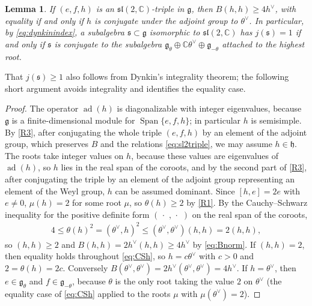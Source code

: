 \documentclass [leqno, 10pt]{amsart}
\newtheorem{lemma}[theorem]{Lemma}%
\theoremstyle{definition}
\numberwithin{equation}{section}
\newcommand{\h}{\mathfrak{h}}
\newcommand{\dum}{\,\cdot\,\,}
\newcommand{\spn}{\operatorname{Span}}
\newcommand{\sll}{\mathfrak{sl}}
\newcommand{\g}{\mathfrak{g}}
\newcommand{\ad}{\operatorname{ad}}
\newcommand{\com}{\mathbb C}
\newcommand{\hv}{h^\vee}
\newcommand{\subs}{\mathfrak{s}}
\begin{document}
\begin{lemma}\label{lem:Bh}
If $(e,f,h)$ is an $\sll(2,\com)$-triple in $\g$, then $B(h,h)\ge4\hv$, with equality if and only if $h$ is conjugate under the adjoint group to $\theta^\vee$. In particular, by \eqref{eq:dynkinindex}, a subalgebra $\subs \subset \g$ isomorphic to $\sll(2, \com)$ has $j(\subs) = 1$ if and only if $\subs$ is conjugate to the subalgebra $\g_{\theta} \oplus \com\theta^{\vee} \oplus \g_{-\theta}$ attached to the highest root.
\end{lemma}
That $j(\subs) \geq 1$ also follows from Dynkin's integrality theorem; the following short argument avoids integrality and identifies the equality case.
\begin{proof}
The operator $\ad(h)$ is diagonalizable with integer eigenvalues, because $\g$ is a finite-dimensional module for $\spn\{e, f, h\}$; in particular $h$ is semisimple. By \ref{R3}, after conjugating the whole triple $(e, f, h)$ by an element of the adjoint group, which preserves $B$ and the relations \eqref{eq:sl2triple}, we may assume $h \in \h$. The roots take integer values on $h$, because these values are eigenvalues of $\ad(h)$, so $h$ lies in the real span of the coroots, and by the second part of \ref{R3}, after conjugating the triple by an element of the adjoint group representing an element of the Weyl group, $h$ can be assumed dominant. Since $[h,e]=2e$ with $e\ne0$, $\mu(h)=2$ for some root $\mu$, so $\theta(h)\ge2$ by \ref{R1}. By the Cauchy--Schwarz inequality for the positive definite form $(\dum, \dum)$ on the real span of the coroots,
\begin{align}\label{eq:CSh}
4 \leq \theta(h)^2=(\theta^\vee,h)^2\le(\theta^{\vee},\theta^{\vee})(h,h)=2(h,h),
\end{align}
so $(h,h)\ge2$ and $B(h,h)=2\hv(h,h)\ge4\hv$ by \eqref{eq:Bnorm}. If $(h, h) = 2$, then equality holds throughout \eqref{eq:CSh}, so $h = c\theta^{\vee}$ with $c > 0$ and $2 = \theta(h) = 2c$. Conversely $B(\theta^\vee,\theta^\vee)=2\hv(\theta^{\vee},\theta^{\vee}) = 4\hv$. If $h = \theta^{\vee}$, then $e \in \g_{\theta}$ and $f \in \g_{-\theta}$, because $\theta$ is the only root taking the value $2$ on $\theta^{\vee}$ (the equality case of \eqref{eq:CSh} applied to the roots $\mu$ with $\mu(\theta^{\vee}) = 2$).
\end{proof}
\end{document}
